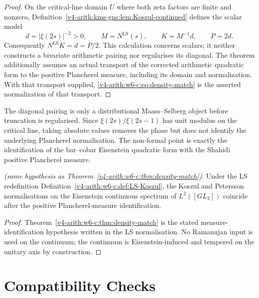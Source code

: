 \begin{proof}
On the critical-line domain \(U\) where both zeta factors are finite
and nonzero, Definition~\ref{v4-arith:kms-gns:lem:Koszul-continued}
defines the scalar model
\[
 d=|\xi(2s)|^{-2}>0,\qquad M=N^{\mathrm{LS}}(s),\qquad
 K=M^{-1}d,\qquad P=2d.
\]
Consequently \(N^{\mathrm{LS}}K=d=P/2\). This calculation concerns
scalars; it neither constructs a bivariate arithmetic pairing nor
regularises its diagonal. The theorem additionally assumes an actual
transport of the corrected arithmetic quadratic form to the positive
Plancherel measure, including its domain and normalization. With that
transport supplied, \eqref{v4-arith:w6-c:eq:density-match} is the
asserted normalization of that transport.
\end{proof}

\begin{remark}
\label{v4-arith:w6-c:rem:squared-modulus}
The diagonal pairing is only a distributional Maass--Selberg object
before truncation is regularised. Since
\(\xi(2s)/\xi(2s-1)\) has unit modulus on the critical line, taking
absolute values removes the phase but does not identify the underlying
Plancherel normalisation. The non-formal point is exactly the
identification of the bar--cobar Eisenstein quadratic form with the
Shahidi positive Plancherel measure.
\end{remark}

\begin{corollary}
\label{v4-arith:w6-c:cor:unconditional}
\emph{(same hypothesis as
Theorem~\ref{v4-arith:w6-c:thm:density-match})}. Under the LS redefinition
Definition~\ref{v4-arith:w6-c:def:LS-Koszul}, the Koszul and Petersson
normalisations on the Eisenstein continuous spectrum of
\(L^{2}([GL_{2}])\) coincide after the positive Plancherel-measure
identification.
\end{corollary}

\begin{proof}
Theorem~\ref{v4-arith:w6-c:thm:density-match} is the stated
measure-identification hypothesis written in the LS normalisation. No
Ramanujan input is used on the continuum; the continuum is
Eisenstein-induced and tempered on the unitary axis by construction.
\end{proof}

\section{Compatibility Checks}
\label{v4-arith:w6-c:LS:compat}

